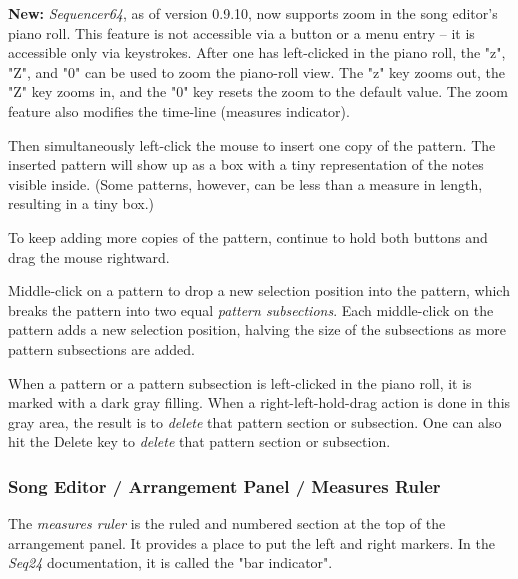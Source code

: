    \textbf{New:}
   \textsl{Sequencer64}, as of version 0.9.10, now supports zoom in the song
   editor's piano roll.  This feature is not accessible via a button or a menu
   entry -- it is accessible only via keystrokes.
   After one has left-clicked in the piano roll, the "z", "Z", and "0"
   can be used to zoom the piano-roll view.  The "z" key zooms out, the "Z" key
   zooms in, and the "0" key resets the zoom to the default value.
   The zoom feature also modifies the time-line (measures indicator).

   Then simultaneously left-click the mouse to insert one copy of the
   pattern.  The inserted pattern will show up as a box with a tiny
   representation of the notes visible inside.  (Some patterns, however, can
   be less than a measure in length, resulting in a tiny box.)

   To keep adding more copies of the pattern, continue to hold both buttons
   and drag the mouse rightward.

   Middle-click on a pattern to drop a new selection position into the
   pattern,
   which breaks the pattern into two equal \textsl{pattern subsections}.
   Each middle-click on the pattern adds a new selection position,
   halving the size of the subsections as more pattern subsections are
   added.

   When a pattern or a pattern subsection is left-clicked in the piano
   roll, it is marked with a dark gray filling.
   When a right-left-hold-drag action is done in this gray area, the result
   is to \textsl{delete} that pattern section or subsection.
   One can also hit the Delete key to \textsl{delete} that pattern section
   or subsection.

\subsubsection{Song Editor / Arrangement Panel / Measures Ruler}
\label{subsubsec:seq64_song_editor_arrangement_panel_measures_ruler}

   The \textsl{measures ruler} is the ruled and numbered section at the top
   of the arrangement panel.  It provides a place to put the left and right
   markers.  In the \textsl{Seq24} documentation, it is called the "bar
   indicator".

